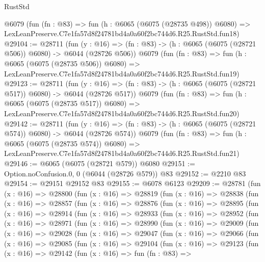 \begin{lexlean}{RustStd}
\begin{coremodule}
    @6079
    (fun (fn : @83) =>
    fun (h : @6065 (@6075 (@28735 @498)) @6080) =>
    LexLeanPreserve.C7e1fa57d8f24781bd4a0a60f2bc744d6.R25.RustStd.fun18)
@29104 := @28711
    (fun (y : @16) => (fn : @83) -> (h : @6065 (@6075 (@28721 @506)) @6080) -> @6044 (@28726 @506))
    @6079
    (fun (fn : @83) =>
    fun (h : @6065 (@6075 (@28735 @506)) @6080) =>
    LexLeanPreserve.C7e1fa57d8f24781bd4a0a60f2bc744d6.R25.RustStd.fun19)
@29123 := @28711
    (fun (y : @16) => (fn : @83) -> (h : @6065 (@6075 (@28721 @517)) @6080) -> @6044 (@28726 @517))
    @6079
    (fun (fn : @83) =>
    fun (h : @6065 (@6075 (@28735 @517)) @6080) =>
    LexLeanPreserve.C7e1fa57d8f24781bd4a0a60f2bc744d6.R25.RustStd.fun20)
@29142 := @28711
    (fun (y : @16) => (fn : @83) -> (h : @6065 (@6075 (@28721 @574)) @6080) -> @6044 (@28726 @574))
    @6079
    (fun (fn : @83) =>
    fun (h : @6065 (@6075 (@28735 @574)) @6080) =>
    LexLeanPreserve.C7e1fa57d8f24781bd4a0a60f2bc744d6.R25.RustStd.fun21)
@29146 := @6065 (@6075 (@28721 @579)) @6080
@29151 := Option.noConfusion.{0, 0} (@6044 (@28726 @579)) @83
@29152 := @2210 @83
@29154 := @29151 @29152 @83
@29155 := @6078 @6123
@29209 := @28781
    (fun (x : @16) =>
    @28800
      (fun (x : @16) =>
      @28819
        (fun (x : @16) =>
        @28838
          (fun (x : @16) =>
          @28857
            (fun (x : @16) =>
            @28876
              (fun (x : @16) =>
              @28895
                (fun (x : @16) =>
                @28914
                  (fun (x : @16) =>
                  @28933
                    (fun (x : @16) =>
                    @28952
                      (fun (x : @16) =>
                      @28971
                        (fun (x : @16) =>
                        @28990
                          (fun (x : @16) =>
                          @29009
                            (fun (x : @16) =>
                            @29028
                              (fun (x : @16) =>
                              @29047
                                (fun (x : @16) =>
                                @29066
                                  (fun (x : @16) =>
                                  @29085
                                    (fun (x : @16) =>
                                    @29104
                                      (fun (x : @16) =>
                                      @29123
                                        (fun (x : @16) =>
                                        @29142
                                          (fun (x : @16) =>
                                          fun (fn : @83) =>

\end{coremodule}
\end{lexlean}
